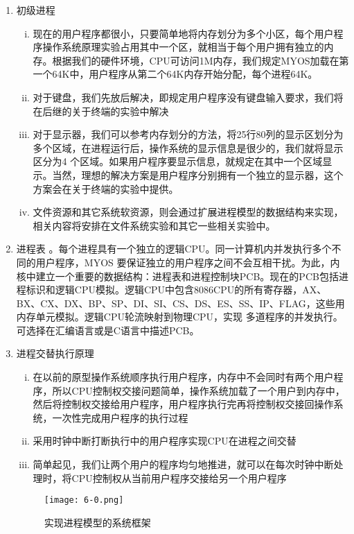 \documentclass[UTF8]{article}
\begin{document}
\begin{enumerate}[1)]
	\item 初级进程
		\begin{enumerate}[i)]
		\heiti \setlength{\itemsep}{0.2ex}
			\item 现在的用户程序都很小，只要简单地将内存划分为多个小区，每个用户程序操作系统原理实验占用其中一个区，就相当于每个用户拥有独立的内存。根据我们的硬件环境，CPU可访问1M内存，我们规定MYOS加载在第一个64K中，用户程序从第二个64K内存开始分配，每个进程64K。
			\item 对于键盘，我们先放后解决，即规定用户程序没有键盘输入要求，我们将在后继的关于终端的实验中解决
			\item 对于显示器，我们可以参考内存划分的方法，将25行80列的显示区划分为多个区域，在进程运行后，操作系统的显示信息是很少的，我们就将显示区分为4
个区域。如果用户程序要显示信息，就规定在其中一个区域显示。当然，理想的解决方案是用户程序分别拥有一个独立的显示器，这个方案会在关于终端的实验中提供。
			\item 文件资源和其它系统软资源，则会通过扩展进程模型的数据结构来实现，相关内容将安排在文件系统实验和其它一些相关实验中。
		\end{enumerate}
	\item 进程表
	\heiti{}。每个进程具有一个独立的逻辑CPU。同一计算机内并发执行多个不同的用户程序，MYOS
要保证独立的用户程序之间不会互相干扰。为此，内核中建立一个重要的数据结构：进程表和进程控制块PCB。现在的PCB包括进程标识和逻辑CPU模拟。逻辑CPU中包含8086CPU的所有寄存器，AX、BX、CX、DX、BP、SP、DI、SI、CS、DS、ES、SS、IP、FLAG，这些用内存单元模拟。逻辑CPU轮流映射到物理CPU，实现
多道程序的并发执行。可选择在汇编语言或是C语言中描述PCB。
		\item 进程交替执行原理
		\begin{enumerate}[i)]
		\heiti \setlength{\itemsep}{0.2ex}
			\item 在以前的原型操作系统顺序执行用户程序，内存中不会同时有两个用户程序，所以CPU控制权交接问题简单，操作系统加载了一个用户到内存中，然后将控制权交接给用户程序，用户程序执行完再将控制权交接回操作系统，一次性完成用户程序的执行过程
			\item 采用时钟中断打断执行中的用户程序实现CPU在进程之间交替
			\item 简单起见，我们让两个用户的程序均匀地推进，就可以在每次时钟中断处理时，将CPU控制权从当前用户程序交接给另一个用户程序
		\end{enumerate}
		\begin{figure}[htbp]
			\centering
			\texttt{[image: 6-0.png]}
			\caption{实现进程模型的系统框架}
		\end{figure}
		

\end{enumerate}
\end{document}
